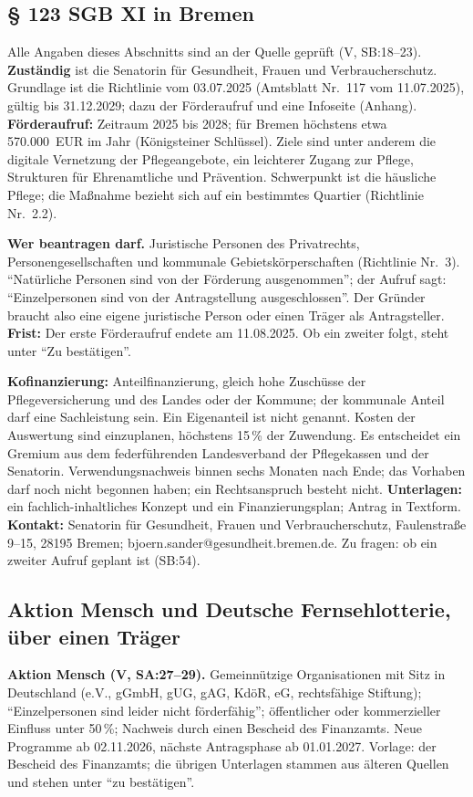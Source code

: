 \documentclass[10pt,parskip=half-]{scrartcl}
\begin{document}
\subsection{§ 123 SGB XI in Bremen}
Alle Angaben dieses Abschnitts sind an der Quelle geprüft (V, SB:18--23).
\textbf{Zuständig} ist die Senatorin für Gesundheit, Frauen und Verbraucherschutz. Grundlage ist
die Richtlinie vom 03.07.2025 (Amtsblatt Nr.~117 vom 11.07.2025), gültig bis 31.12.2029;
dazu der Förderaufruf und eine Infoseite (Anhang). \textbf{Förderaufruf:} Zeitraum 2025 bis 2028; für Bremen höchstens etwa 570.000~EUR im Jahr
(Königsteiner Schlüssel). Ziele sind unter anderem die digitale Vernetzung der Pflegeangebote,
ein leichterer Zugang zur Pflege, Strukturen für Ehrenamtliche und Prävention. Schwerpunkt ist
die häusliche Pflege; die Maßnahme bezieht sich auf ein bestimmtes Quartier (Richtlinie Nr.~2.2).

\textbf{Wer beantragen darf.} Juristische Personen des Privatrechts, Personengesellschaften und
kommunale Gebietskörperschaften (Richtlinie Nr.~3). \enquote{Natürliche Personen sind von der
Förderung ausgenommen}; der Aufruf sagt: \enquote{Einzelpersonen sind von der Antragstellung
ausgeschlossen}. Der Gründer braucht also eine eigene juristische Person oder einen Träger als
Antragsteller. \textbf{Frist:} Der erste Förderaufruf endete am 11.08.2025. Ob ein zweiter
folgt, steht unter \enquote{Zu bestätigen}.

\textbf{Kofinanzierung:} Anteilfinanzierung, gleich hohe Zuschüsse der Pflegeversicherung und
des Landes oder der Kommune; der kommunale Anteil darf eine Sachleistung sein. Ein Eigenanteil
ist nicht genannt. Kosten der Auswertung sind einzuplanen, höchstens 15\,\% der Zuwendung. Es
entscheidet ein Gremium aus dem federführenden Landesverband der Pflegekassen und der
Senatorin. Verwendungsnachweis binnen sechs Monaten nach Ende; das Vorhaben darf noch nicht
begonnen haben; ein Rechtsanspruch besteht nicht. \textbf{Unterlagen:} ein
fachlich-inhaltliches Konzept und ein Finanzierungsplan; Antrag in Textform. \textbf{Kontakt:}
Senatorin für Gesundheit, Frauen und Verbraucherschutz, Faulenstraße 9--15,
28195 Bremen; bjoern.sander@gesundheit.bremen.de. Zu fragen: ob ein zweiter Aufruf geplant ist
(SB:54).

\subsection{Aktion Mensch und Deutsche Fernsehlotterie, über einen Träger}
\textbf{Aktion Mensch (V, SA:27--29).} Gemeinnützige Organisationen mit Sitz in Deutschland
(e.V., gGmbH, gUG, gAG, KdöR, eG, rechtsfähige Stiftung); \enquote{Einzelpersonen sind leider
nicht förderfähig}; öffentlicher oder kommerzieller Einfluss unter 50\,\%; Nachweis durch einen
Bescheid des Finanzamts. Neue Programme ab 02.11.2026, nächste Antragsphase ab 01.01.2027.
Vorlage: der Bescheid des Finanzamts; die übrigen Unterlagen stammen aus älteren Quellen und
stehen unter \enquote{zu bestätigen}.
\end{document}
